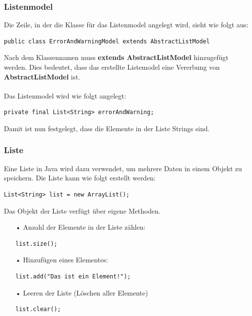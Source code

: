 \subsubsection{Listenmodel}
Die Zeile, in der die Klasse für das Listenmodel angelegt wird, sieht wie folgt aus:
\begin{lstlisting}[style=JavaStyle, caption=Listenmodel-Klasse erstellen]
	public class ErrorAndWarningModel extends AbstractListModel
\end{lstlisting}
Nach dem Klassennamen muss \textbf{extends AbstractListModel} hinzugefügt werden. Dies bedeutet, dass das erstellte Listemodel eine Vererbung von \textbf{AbstractListModel} ist.
\\ \\
Das Listenmodel wird wie folgt angelegt:
\begin{lstlisting}[style=JavaStyle, caption=Liste erstellen im Model]
	private final List<String> errorAndWarning;
\end{lstlisting}
Damit ist nun festgelegt, dass die Elemente in der Liste Strings sind. 

\subsubsection{Liste}
Eine Liste in Java wird dazu verwendet, um mehrere Daten in einem Objekt zu speichern. Die Liste kann wie folgt erstellt werden:
\begin{lstlisting}[style=JavaStyle, caption=Liste erstellen]
	List<String> list = new ArrayList();
\end{lstlisting}
Das Objekt der Liste verfügt über eigene Methoden. 
\begin{itemize}
\item[•] Anzahl der Elemente in der Liste zählen: 
\begin{lstlisting}[style=JavaStyle, caption=Anzahl der Elemente abfragen]
	list.size();
\end{lstlisting}
\item[•] Hinzufügen eines Elementes:
\begin{lstlisting}[style=JavaStyle, caption=Element hinzufügen]
	list.add("Das ist ein Element!");
\end{lstlisting}
\item[•] Leeren der Liste (Löschen aller Elemente)
\begin{lstlisting}[style=JavaStyle, caption=Liste leeren]
	list.clear();
\end{lstlisting}
\end{itemize}

